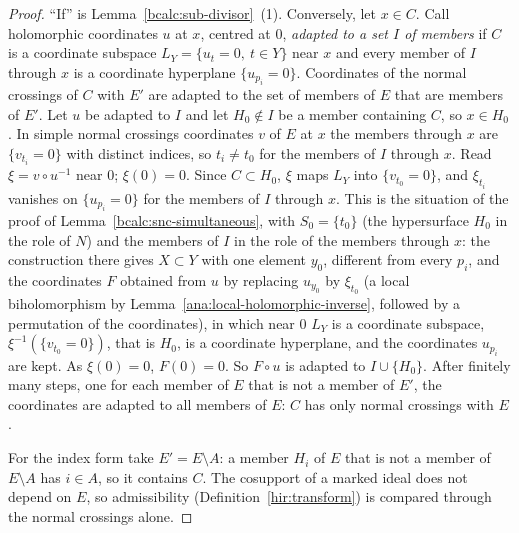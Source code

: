 \begin{proof}
\mixedleanok
``If'' is Lemma~\ref{bcalc:sub-divisor}~(1). Conversely, let \(x\in C\). Call holomorphic coordinates \(u\) at \(x\), centred at \(0\), \emph{adapted to
a set \(I\) of members} if \(C\) is a coordinate subspace \(L_Y=\{u_t=0,\ t\in Y\}\) near \(x\) and every member of \(I\) through \(x\) is a coordinate
hyperplane \(\{u_{p_i}=0\}\). Coordinates of the normal crossings of \(C\) with \(E'\) are adapted to the set of members of \(E\) that are members of
\(E'\). Let \(u\) be adapted to \(I\) and let \(H_0\notin I\) be a member containing \(C\), so \(x\in H_0\). In simple normal crossings coordinates \(v\) of
\(E\) at \(x\) the members through \(x\) are \(\{v_{t_i}=0\}\) with distinct indices, so \(t_i\ne t_0\) for the members of \(I\) through \(x\).
Read \(\xi=v\circ u^{-1}\) near \(0\); \(\xi(0)=0\). Since \(C\subset H_0\), \(\xi\) maps \(L_Y\) into \(\{v_{t_0}=0\}\), and \(\xi_{t_i}\) vanishes on
\(\{u_{p_i}=0\}\) for the members of \(I\) through \(x\). This is the situation of the proof of Lemma~\ref{bcalc:snc-simultaneous}, with
\(S_0=\{t_0\}\) (the hypersurface \(H_0\) in the role of \(N\)) and the members of \(I\) in the role of the members through \(x\): the construction there
gives \(X\subset Y\) with one element \(y_0\), different from every \(p_i\), and the coordinates \(F\) obtained from \(u\) by replacing \(u_{y_0}\) by
\(\xi_{t_0}\) (a local biholomorphism by Lemma~\ref{ana:local-holomorphic-inverse}, followed by a permutation of the coordinates), in which near \(0\)
\(L_Y\) is a coordinate subspace, \(\xi^{-1}(\{v_{t_0}=0\})\), that is \(H_0\), is a coordinate hyperplane, and the coordinates \(u_{p_i}\) are kept.
As \(\xi(0)=0\), \(F(0)=0\). So \(F\circ u\) is adapted to \(I\cup\{H_0\}\). After finitely many steps, one for each member of \(E\) that is not a member
of \(E'\), the coordinates are adapted to all members of \(E\): \(C\) has only normal crossings with \(E\).

For the index form take \(E'=E\setminus A\): a member \(H_i\) of \(E\) that is not a member of \(E\setminus A\) has \(i\in A\), so it contains \(C\). The
cosupport of a marked ideal does not depend on \(E\), so admissibility (Definition~\ref{hir:transform}) is compared through the normal crossings alone.
\end{proof}

